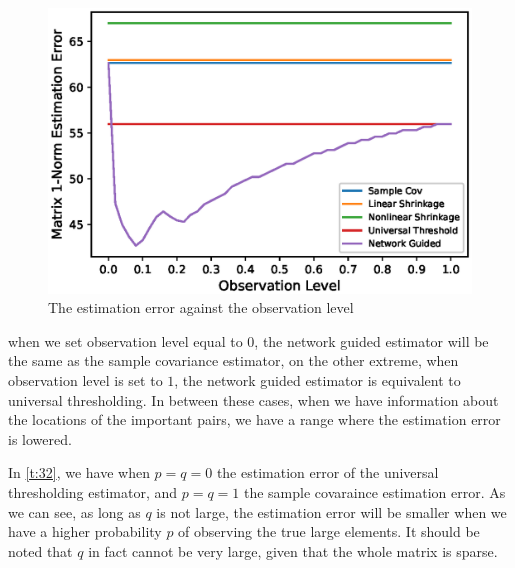 \begin{figure}[htbp]
     \centering
     \includegraphics{asset/observation-level--1.eps}
     \caption{The estimation error against the observation level}
     \label{fig:3}
\end{figure}
when we set observation level equal to \(0\), the network guided estimator will be the same as the sample covariance estimator, on the other extreme, when observation level is set to \(1\), the network guided estimator is equivalent to universal thresholding. In between these cases, when we have information about the locations of the important pairs, we have a range where the estimation error is lowered. 





In \autoref{t:32}, we have when \(p = q = 0\) the estimation error of the universal thresholding estimator, and \(p =q =1\) the sample covaraince estimation error. As we can see, as long as \(q\) is not large, the estimation error will be smaller when we have a higher probability \(p\) of observing the true large elements. It should be noted that \(q\) in fact cannot be very large, given that the whole matrix is sparse. 
